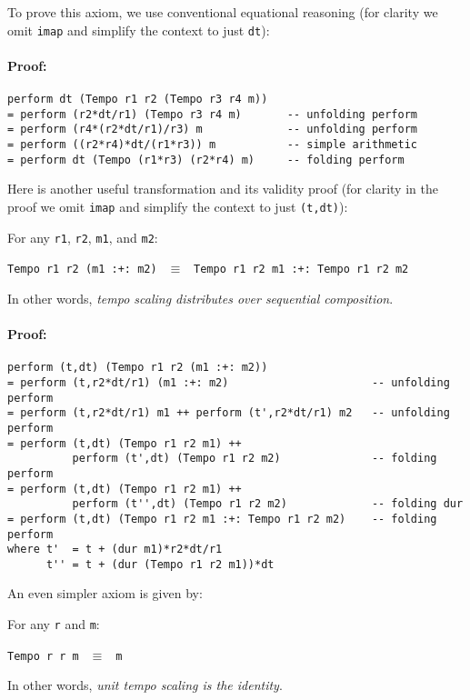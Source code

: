 To prove this axiom, we use conventional equational reasoning (for
clarity we omit {\tt imap} and simplify the context to just {\tt dt}):
\paragraph*{Proof:}
\begin{verbatim} 
perform dt (Tempo r1 r2 (Tempo r3 r4 m))
= perform (r2*dt/r1) (Tempo r3 r4 m)       -- unfolding perform
= perform (r4*(r2*dt/r1)/r3) m             -- unfolding perform
= perform ((r2*r4)*dt/(r1*r3)) m           -- simple arithmetic
= perform dt (Tempo (r1*r3) (r2*r4) m)     -- folding perform
\end{verbatim} 

Here is another useful transformation and its validity proof (for
clarity in the proof we omit {\tt imap} and simplify the context to
just {\tt (t,dt)}):

\begin{axiom}
For any {\tt r1}, {\tt r2}, {\tt m1}, and {\tt m2}:
\begin{center}
{\tt Tempo r1 r2 (m1 :+:\ m2)} $\ \ \equiv\ \ $ {\tt Tempo r1 r2 m1 :+:\ Tempo r1 r2 m2}
\end{center}
\end{axiom}
In other words, {\em tempo scaling distributes over sequential
composition}.
\paragraph*{Proof:}
\begin{verbatim} 
perform (t,dt) (Tempo r1 r2 (m1 :+: m2))
= perform (t,r2*dt/r1) (m1 :+: m2)                      -- unfolding perform
= perform (t,r2*dt/r1) m1 ++ perform (t',r2*dt/r1) m2   -- unfolding perform
= perform (t,dt) (Tempo r1 r2 m1) ++ 
          perform (t',dt) (Tempo r1 r2 m2)              -- folding perform
= perform (t,dt) (Tempo r1 r2 m1) ++ 
          perform (t'',dt) (Tempo r1 r2 m2)             -- folding dur
= perform (t,dt) (Tempo r1 r2 m1 :+: Tempo r1 r2 m2)    -- folding perform
where t'  = t + (dur m1)*r2*dt/r1
      t'' = t + (dur (Tempo r1 r2 m1))*dt
\end{verbatim} 

An even simpler axiom is given by:

\begin{axiom}
For any {\tt r} and {\tt m}:
\begin{center}
{\tt Tempo r r m} $\ \ \equiv\ \ $ {\tt m}
\end{center}
\end{axiom}
In other words, {\em unit tempo scaling is the identity}.

